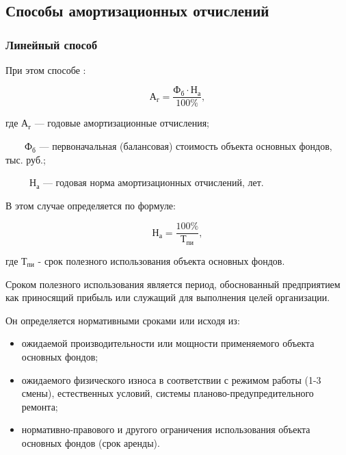 \chapter{}

\section{Способы амортизационных отчислений}

\subsection{Линейный способ}

\begin{tcolorbox}
При этом способе :

\begin{equation}
    \text{А}_{\text{г}} = \frac{\text{Ф}_{\text{б}} \cdot
    \text{Н}_{\text{а}}}{100 \%},
\end{equation}

где $\text{А}_{\text{г}}$ --- годовые амортизационные отчисления;

~~~~$\text{Ф}_{\text{б}}$ --- первоначальная (балансовая) стоимость объекта основных
фондов, тыс. руб.;

~~~~~$\text{Н}_{\text{а}}$ --- годовая норма амортизационных
отчислений, лет.
\end{tcolorbox}

\begin{tcolorbox}
В этом случае  определяется по формуле:

\begin{equation}
    \text{Н}_{\text{а}} = \frac{100 \%}{\text{Т}_{\text{пи}}},
\end{equation}

где $\text{Т}_{\text{пи}}$ - срок полезного использования объекта основных фондов.
\end{tcolorbox}

Сроком полезного использования является период, обоснованный предприятием как
приносящий прибыль или служащий для выполнения целей организации.

Он определяется нормативными сроками или исходя из:

\begin{itemize}
    \item ожидаемой производительности или мощности применяемого объекта
        основных фондов;
    \item ожидаемого физического износа в соответствии с режимом работы (1-3
        смены), естественных условий, системы планово-предупредительного
        ремонта;
    \item нормативно-правового и другого ограничения использования объекта
        основных фондов (срок аренды).
\end{itemize}

